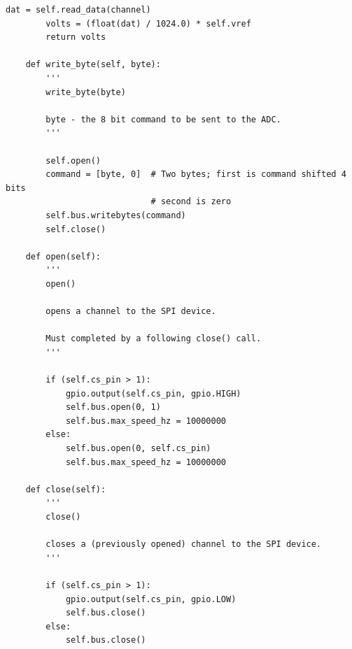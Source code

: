 \documentclass[twoside,a4]{report}
\begin{document}
\begin{Verbatim}[frame=single]
		dat = self.read_data(channel)
		volts = (float(dat) / 1024.0) * self.vref
		return volts
	
	def write_byte(self, byte):
		'''
		write_byte(byte)
		
		byte - the 8 bit command to be sent to the ADC.
		'''
		
		self.open()
		command = [byte, 0]  # Two bytes; first is command shifted 4 bits
		                     # second is zero
		self.bus.writebytes(command)
		self.close()
	
	def open(self):
		'''
		open()
		
		opens a channel to the SPI device.
		
		Must completed by a following close() call.
		'''
		
		if (self.cs_pin > 1):
			gpio.output(self.cs_pin, gpio.HIGH)
			self.bus.open(0, 1)
			self.bus.max_speed_hz = 10000000
		else:
			self.bus.open(0, self.cs_pin)
			self.bus.max_speed_hz = 10000000
	
	def close(self):
		'''
		close()
		
		closes a (previously opened) channel to the SPI device.
		'''
		
		if (self.cs_pin > 1):
			gpio.output(self.cs_pin, gpio.LOW)
			self.bus.close()
		else:
			self.bus.close()
\end{Verbatim}
\end{document}
